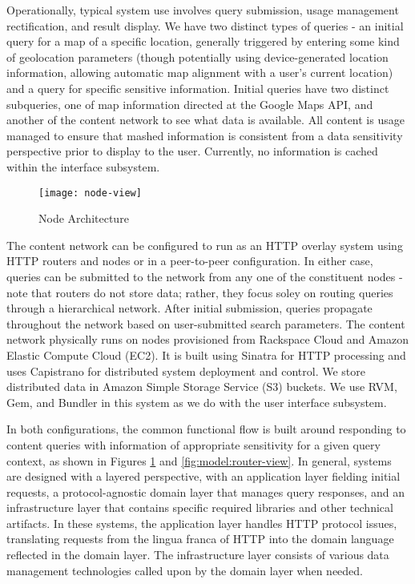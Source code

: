 Operationally, typical system use involves query submission, usage management rectification,  and result display.  We have two distinct types of queries - an initial query for a map of a specific location, generally triggered by entering some kind of geolocation parameters (though potentially using device-generated location information, allowing automatic map alignment with a user's current location) and a query for specific sensitive information.  Initial queries have two distinct subqueries, one of map information directed at the Google Maps API, and another of the content network to see what data is available.  All content is usage managed to ensure that mashed information is consistent from a data sensitivity perspective prior to display to the user.  Currently, no information is cached within the interface subsystem.

\begin{figure}[!t]
\centering
\texttt{[image: node-view]}
\caption{Node Architecture}
\label{fig:model:node-view}
\end{figure}

The content network can be configured to run as an HTTP overlay system using HTTP routers and nodes or in a peer-to-peer configuration.  In either case, queries can be submitted to the network from any one of the constituent nodes - note that routers do not store data; rather, they focus soley on routing queries through a hierarchical network.  After initial submission, queries propagate throughout the network based on user-submitted search parameters.  The content network physically runs on nodes provisioned from Rackspace Cloud and Amazon Elastic Compute Cloud (EC2).  It is built using Sinatra for HTTP processing and uses Capistrano for distributed system deployment and control.  We store distributed data in Amazon Simple Storage Service (S3) buckets.  We use RVM, Gem, and Bundler in this system as we do with the user interface subsystem.

In both configurations, the common functional flow is built around responding to content queries with information of appropriate sensitivity for a given query context, as shown in Figures \ref{fig:model:node-view} and \ref{fig:model:router-view}.  In general, systems are designed with a layered perspective, with an application layer fielding initial requests, a protocol-agnostic domain layer that manages query responses, and an infrastructure layer that contains specific required libraries and other technical artifacts.  In these systems, the application layer handles HTTP protocol issues, translating requests from the lingua franca of HTTP into the domain language reflected in the domain layer.  The infrastructure layer consists of various data management technologies called upon by the domain layer when needed.

